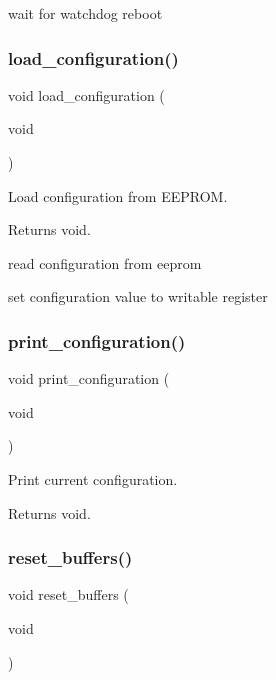 wait for watchdog reboot \mbox{\label{i2c-rain_8h_a1be652e7d942160a14a560e0be837358}} 
\subsubsection{\texorpdfstring{load\+\_\+configuration()}{load\_configuration()}}
{\footnotesize\ttfamily void load\+\_\+configuration (\begin{DoxyParamCaption}\item[{void}]{ }\end{DoxyParamCaption})}



Load configuration from E\+E\+P\+R\+OM. 

\begin{DoxyReturn}{Returns}
void. 
\end{DoxyReturn}
read configuration from eeprom

set configuration value to writable register \mbox{\label{i2c-rain_8h_ab08b9047f47849f399950705e769be2e}} 
\subsubsection{\texorpdfstring{print\+\_\+configuration()}{print\_configuration()}}
{\footnotesize\ttfamily void print\+\_\+configuration (\begin{DoxyParamCaption}\item[{void}]{ }\end{DoxyParamCaption})}



Print current configuration. 

\begin{DoxyReturn}{Returns}
void. 
\end{DoxyReturn}
\mbox{\label{i2c-rain_8h_a717429168fb5542a7b36a94712f7c67e}} 
\subsubsection{\texorpdfstring{reset\+\_\+buffers()}{reset\_buffers()}}
{\footnotesize\ttfamily void reset\+\_\+buffers (\begin{DoxyParamCaption}\item[{void}]{ }\end{DoxyParamCaption})}



